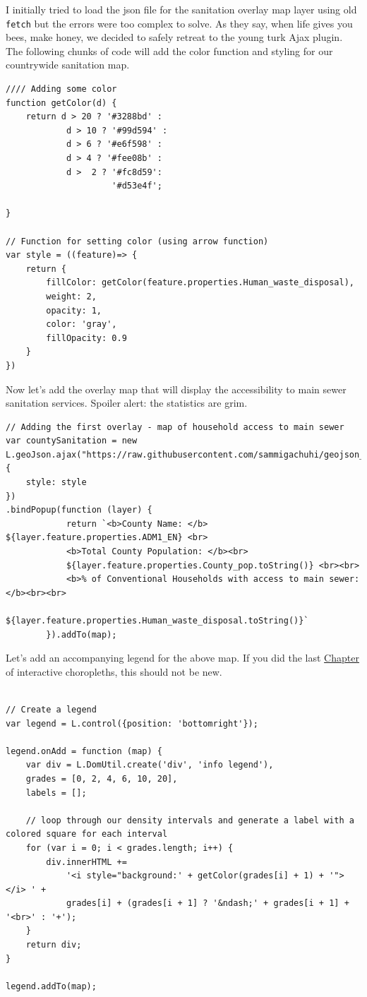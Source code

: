 \documentclass[
]{book}
\begin{document}
I initially tried to load the json file for the sanitation overlay map layer using old \texttt{fetch} but the errors were too complex to solve. As they say, when life gives you bees, make honey, we decided to safely retreat to the young turk Ajax plugin. The following chunks of code will add the color function and styling for our countrywide sanitation map.

\begin{verbatim}
//// Adding some color
function getColor(d) {
    return d > 20 ? '#3288bd' :
            d > 10 ? '#99d594' :
            d > 6 ? '#e6f598' :
            d > 4 ? '#fee08b' :
            d >  2 ? '#fc8d59':
                     '#d53e4f';
                       
}

// Function for setting color (using arrow function)
var style = ((feature)=> {
    return {
        fillColor: getColor(feature.properties.Human_waste_disposal),
        weight: 2,
        opacity: 1,
        color: 'gray',
        fillOpacity: 0.9
    }
})
\end{verbatim}

Now let's add the overlay map that will display the accessibility to main sewer sanitation services. Spoiler alert: the statistics are grim.

\begin{verbatim}
// Adding the first overlay - map of household access to main sewer
var countySanitation = new L.geoJson.ajax("https://raw.githubusercontent.com/sammigachuhi/geojson_files/main/counties_sanitation.json", {
    style: style
})
.bindPopup(function (layer) {
            return `<b>County Name: </b> ${layer.feature.properties.ADM1_EN} <br>
            <b>Total County Population: </b><br> 
            ${layer.feature.properties.County_pop.toString()} <br><br>
            <b>% of Conventional Households with access to main sewer: </b><br><br>
            ${layer.feature.properties.Human_waste_disposal.toString()}`
        }).addTo(map);
\end{verbatim}

Let's add an accompanying legend for the above map. If you did the last \protect\hyperlink{creating-an-interactive-choropleth-map}{Chapter} of interactive choropleths, this should not be new.

\begin{verbatim}

// Create a legend
var legend = L.control({position: 'bottomright'});

legend.onAdd = function (map) {
    var div = L.DomUtil.create('div', 'info legend'),
    grades = [0, 2, 4, 6, 10, 20],
    labels = [];

    // loop through our density intervals and generate a label with a colored square for each interval
    for (var i = 0; i < grades.length; i++) {
        div.innerHTML += 
            '<i style="background:' + getColor(grades[i] + 1) + '"></i> ' + 
            grades[i] + (grades[i + 1] ? '&ndash;' + grades[i + 1] + '<br>' : '+');
    }
    return div;
}

legend.addTo(map);
\end{verbatim}
\end{document}
